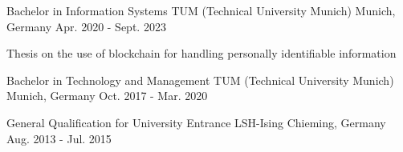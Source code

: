 


\begin{cventries}

\cventry
{Bachelor in Information Systems} %
{TUM (Technical University Munich)} %
{Munich, Germany} %
{Apr. 2020 - Sept. 2023} %
{ %
\begin{cvitems}
\item Thesis on the use of blockchain for handling personally identifiable information
\end{cvitems}
}

\cventry
{Bachelor in Technology and Management} %
{TUM (Technical University Munich)} %
{Munich, Germany} %
{Oct. 2017 - Mar. 2020} %
{ %
\begin{cvitems}
\end{cvitems}
}

\cventry
{General Qualification for University Entrance} %
{LSH-Ising} %
{Chieming, Germany} %
{Aug. 2013 - Jul. 2015} %
{ %
\begin{cvitems}
\end{cvitems}
}



\end{cventries}